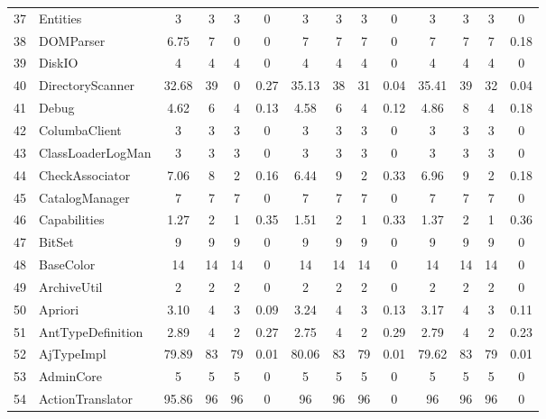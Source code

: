 \documentclass[conference]{IEEEtran}
\begin{document}
\begin{table} [ht]
{\begin{tabular}{|c|l|c|c|c|c|c|c|c|c|c|c|c|c|}
 37						& Entities						& 3	&	3	&	3	& 		0					& 3		& 3 		& 3		& 		0			& 3			& 3			& 3			&	0\\      
 38						& DOMParser					& 6.75&	7	&	0	& 		0					& 7		& 7 		& 7		& 		0			& 7			& 7			& 7			&	0.18\\      
 39						& DiskIO						& 4	&	4	&	4	& 		0					& 4		& 4 		& 4		& 		0			& 4			& 4			& 4			&	0\\      
 40						& DirectoryScanner				& 32.68&	39	&	0	& 		0.27					& 35.13	& 38 		& 31		& 		0.04			& 35.41		& 39			& 32			&	0.04\\      
 41						& Debug						& 4.62&	6	&	4	& 		0.13					& 4.58	& 6 		& 4		& 		0.12			& 4.86		& 8			& 4			&	0.18\\      
 42						& ColumbaClient				& 3	&	3	&	3	& 		0					& 3		& 3 		& 3		& 		0			& 3			& 3			& 3			&	0\\      
 43						& ClassLoaderLogMan		& 3	&	3	&	3	& 		0					& 3		& 3 		& 3		& 		0			& 3			& 3			& 3			&	0\\      
 44						& CheckAssociator				& 7.06&	8	&	2	& 		0.16					& 6.44	& 9 		& 2		& 		0.33			& 6.96		& 9			& 2			&	0.18\\      
 45						& CatalogManager				& 7	&	7	&	7	& 		0					& 7		& 7 		& 7		& 		0			& 7			& 7			& 7			&	0\\      
 46						& Capabilities					& 1.27&	2	&	1	& 		0.35					& 1.51	& 2 		& 1		& 		0.33			& 1.37		& 2			& 1			&	0.36\\      
 47						& BitSet						& 9	&	9	&	9	& 		0					& 9		& 9 		& 9		& 		0			& 9			& 9			& 9			&	0\\      
 48						& BaseColor					& 14	&	14	&	14	& 		0					& 14		& 14 		& 14		& 		0			& 14			& 14			& 14			&	0\\      
 49						& ArchiveUtil					& 2	&	2	&	2	& 		0					& 2		& 2 		& 2		& 		0			& 2			& 2			& 2			&	0\\      
 50						& Apriori						& 3.10&	4	&	3	& 		0.09					& 3.24	& 4 		& 3		& 		0.13			& 3.17		& 4			& 3			&	0.11\\      
 51						& AntTypeDefinition				& 2.89&	4	&	2	& 		0.27					& 2.75	& 4 		& 2		& 		0.29			& 2.79		& 4			& 2			&	0.23\\      
 52						& AjTypeImpl					& 79.89&	83	&	79	& 		0.01					& 80.06	& 83 		& 79		& 		0.01			& 79.62		& 83			& 79			&	0.01\\      
 53						& AdminCore					& 5	&	5	&	5	& 		0					& 5		& 5 		& 5		& 		0			& 5			& 5			& 5			&	0\\      
 54						& ActionTranslator				& 95.86&	96	&	96	& 		0					& 96		& 96 		& 96		& 		0			& 96			& 96			& 96			&	0\\      

\end{tabular}}
\end{table}
\end{document}
